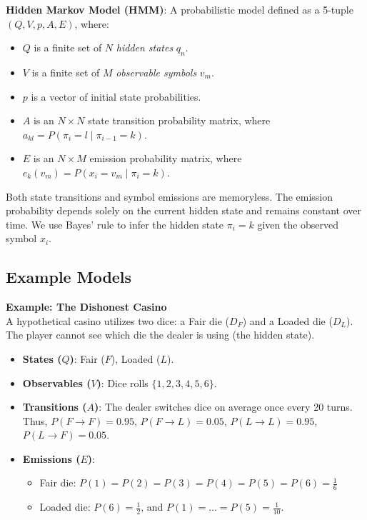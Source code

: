 \begin{important}
\textbf{Hidden Markov Model (HMM)}: A probabilistic model defined as a 5-tuple $(Q, V, p, A, E)$, where:
\begin{itemize}
    \item $Q$ is a finite set of $N$ \textit{hidden states} $q_n$.
    \item $V$ is a finite set of $M$ \textit{observable symbols} $v_m$.
    \item $p$ is a vector of initial state probabilities.
    \item $A$ is an $N \times N$ state transition probability matrix, where $a_{kl} = P(\pi_i = l \mid \pi_{i-1} = k)$.
    \item $E$ is an $N \times M$ emission probability matrix, where $e_k(v_m) = P(x_i = v_m \mid \pi_i = k)$.
\end{itemize}
\end{important}

\sta Both state transitions and symbol emissions are memoryless. The emission probability depends solely on the current hidden state and remains constant over time. We use Bayes' rule to infer the hidden state $\pi_i = k$ given the observed symbol $x_i$.


\subsection{Example Models}

\textbf{Example: The Dishonest Casino} \\
A hypothetical casino utilizes two dice: a Fair die ($D_F$) and a Loaded die ($D_L$). The player cannot see which die the dealer is using (the hidden state).
\begin{itemize}
    \item \textbf{States ($Q$)}: Fair ($F$), Loaded ($L$).
    \item \textbf{Observables ($V$)}: Dice rolls $\{1, 2, 3, 4, 5, 6\}$.
    \item \textbf{Transitions ($A$)}: The dealer switches dice on average once every 20 turns. Thus, $P(F \to F) = 0.95$, $P(F \to L) = 0.05$, $P(L \to L) = 0.95$, $P(L \to F) = 0.05$.
    \item \textbf{Emissions ($E$)}: 
    \begin{itemize}
        \item Fair die: $P(1) = P(2) = P(3) = P(4) = P(5) = P(6) = \frac{1}{6}$
        \item Loaded die: $P(6) = \frac{1}{2}$, and $P(1) = \dots = P(5) = \frac{1}{10}$.
    \end{itemize}
\end{itemize}

